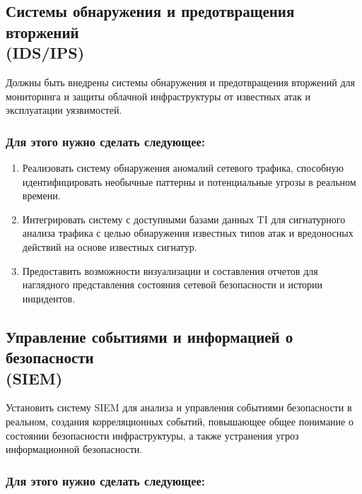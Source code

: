 \documentclass[14pt, a4paper]{extarticle}
\begin{document}
\subsection{Системы обнаружения и предотвращения вторжений\\ (IDS/IPS)}

Должны быть внедрены системы обнаружения и предотвращения вторжений для мониторинга и защиты облачной инфраструктуры от известных атак и эксплуатации уязвимостей.

\subsubsection*{Для этого нужно сделать следующее:}

\begin{enumerate}
\item Реализовать систему обнаружения аномалий сетевого трафика, способную идентифицировать необычные паттерны и потенциальные угрозы в реальном времени.
\item Интегрировать систему с доступными базами данных TI для сигнатурного анализа трафика с целью обнаружения известных типов атак и вредоносных действий на основе известных сигнатур.
\item Предоставить возможности визуализации и составления отчетов для наглядного представления состояния сетевой безопасности и истории инцидентов.
\end{enumerate}

\subsection{Управление событиями и информацией о безопасности\\ (SIEM)}

Установить систему SIEM для анализа и управления событиями безопасности в реальном, создания корреляционных событий, повышающее общее понимание о состоянии безопасности инфраструктуры, а также устранения угроз информационной безопасности.

\subsubsection*{Для этого нужно сделать следующее:}
\end{document}
